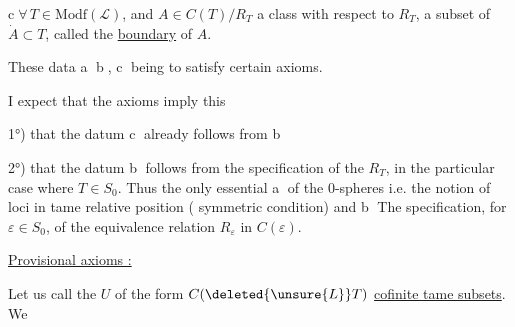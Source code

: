 
\textcircled{\scriptsize c}\quad $\forall\,T\in\mathrm{Modf}(\mathcal L)$, and $A\in C(T)/R_T$
a class with respect to $R_T$, a subset
of $\dot A\subset T$, called the \uline{boundary} of $A$.

These data \textcircled{\scriptsize a} \textcircled{\scriptsize b}, \textcircled{\scriptsize c} being 
to satisfy certain axioms.

I expect that the axioms imply
this

1°) that the datum \textcircled{\scriptsize c} already follows from \textcircled{\scriptsize b}

2°) that the datum \textcircled{\scriptsize b} follows from
the specification of the $R_T$,  in the
particular case where $T\in S_0$. Thus
the only essential  
\textcircled{\scriptsize a}  of the 0-spheres i.e. the notion
of  loci in tame relative position
( symmetric condition) and \textcircled{\scriptsize b} The specification,
for  $\varepsilon\in S_0$, of the
equivalence relation $R_{\varepsilon}$ in $C(\varepsilon)$.

 \uline{Provisional axioms :}

 Let us call the $U$ of the form
$C(\deleted{\unsure{L}}T)$ \uline{cofinite tame subsets}. We

